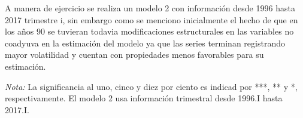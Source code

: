 \documentclass[12pt,letterpaper]{article}
\begin{document}
A manera de ejercicio se realiza un modelo 2 con información desde 1996 hasta 2017 trimestre i, sin embargo como se menciono inicialmente el hecho de que en los años 90 se tuvieran todavia modificaciones estructurales en las variables no coadyuva en la estimación del modelo ya que las series terminan registrando mayor volatilidad y cuentan con propiedades menos favorables para su estimación. 

\begin{table}
\begin{center}
\caption{Modelos de cointegración}
\end{center}
\begin{scriptsize}
\emph{Nota:} La significancia al uno, cinco y diez por ciento es indicad por ***, ** y *, respectivamente. El modelo 2 usa información trimestral desde 1996.I hasta 2017.I.
\end{scriptsize}								
\end{table}	
\end{document}

